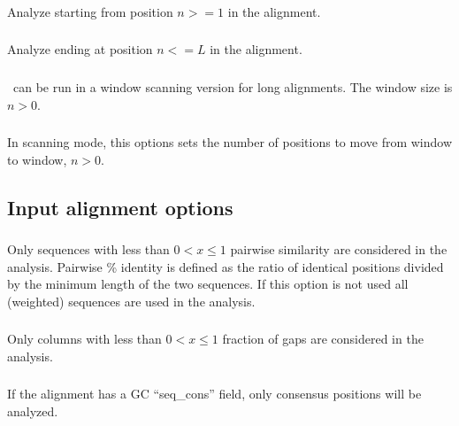 \subsubsection{} Analyze starting from position $n >= 1$ in the alignment.

\subsubsection{} Analyze ending at position $n <= L$ in the alignment.

\subsubsection{} \rscape\ can be run in a window scanning version for long alignments.
The window size is $n>0$.

\subsubsection{} In scanning mode, this options sets the number of positions to move from window to window, $n >0$.



\subsection{Input alignment options}

\subsubsection{} Only sequences with less than $0<x\leq 1$
pairwise similarity are considered in the analysis.  Pairwise \%
identity is defined as the ratio of identical positions divided by the
minimum length of the two sequences. If this option is not used all
(weighted) sequences are used in the analysis.

\subsubsection{} Only columns with less than $0<x\leq 1$ fraction of gaps are considered in the analysis.

\subsubsection{} If the alignment has a GC ``seq\_cons'' field, only consensus positions will be analyzed.

